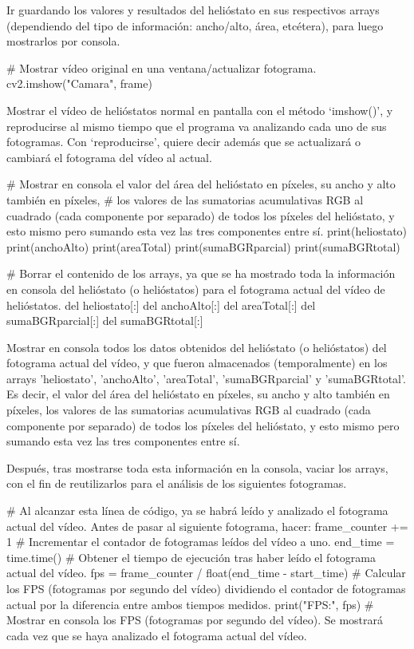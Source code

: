 Ir guardando los valores y resultados del helióstato en sus respectivos arrays (dependiendo del tipo de información: ancho/alto, área, etcétera), para luego mostrarlos por consola.


\# Mostrar vídeo original en una ventana/actualizar fotograma.
cv2.imshow("Camara", frame)

Mostrar el vídeo de helióstatos normal en pantalla con el método ‘imshow()’, y reproducirse al mismo tiempo que el programa va analizando cada uno de sus fotogramas. Con ‘reproducirse’, quiere decir además que se actualizará o cambiará el fotograma del vídeo al actual.


\# Mostrar en consola el valor del área del helióstato en píxeles, su ancho y alto también en píxeles,
\# los valores de las sumatorias acumulativas RGB al cuadrado (cada componente por separado) de todos los píxeles del helióstato, y esto mismo pero sumando esta vez las tres componentes entre sí.
    print(heliostato)
    print(anchoAlto)
    print(areaTotal)
    print(sumaBGRparcial)
    print(sumaBGRtotal)

\# Borrar el contenido de los arrays, ya que se ha mostrado toda la información en consola del helióstato (o helióstatos) para el fotograma actual del vídeo de helióstatos.
    del heliostato[:]
    del anchoAlto[:]
    del areaTotal[:]
    del sumaBGRparcial[:]
    del sumaBGRtotal[:]
    
Mostrar en consola todos los datos obtenidos del helióstato (o helióstatos) del fotograma actual del vídeo, y que fueron almacenados (temporalmente) en los arrays 'heliostato', 'anchoAlto', 'areaTotal', 'sumaBGRparcial' y 'sumaBGRtotal'. Es decir, el valor del área del helióstato en píxeles, su ancho y alto también en píxeles, los valores de las sumatorias acumulativas RGB al cuadrado (cada componente por separado) de todos los píxeles del helióstato, y esto mismo pero sumando esta vez las tres componentes entre sí.

Después, tras mostrarse toda esta información en la consola, vaciar los arrays, con el fin de reutilizarlos para el análisis de los siguientes fotogramas.


\# Al alcanzar esta línea de código, ya se habrá leído y analizado el fotograma actual del vídeo. Antes de pasar al siguiente fotograma, hacer:
    frame\_counter += 1 \# Incrementar el contador de fotogramas leídos del vídeo a uno.
    end\_time = time.time() \# Obtener el tiempo de ejecución tras haber leído el fotograma actual del vídeo.
    fps = frame\_counter / float(end\_time - start\_time) \# Calcular los FPS (fotogramas por segundo del vídeo) dividiendo el contador de fotogramas actual por la diferencia entre ambos tiempos medidos.
    print("FPS:", fps) \# Mostrar en consola los FPS (fotogramas por segundo del vídeo). Se mostrará cada vez que se haya analizado el fotograma actual del vídeo.


